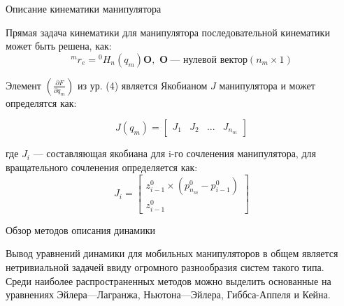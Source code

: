 \documentclass[newPxFont,numfooter,sectionpages]{beamer}
\begin{document}
\begin{frame}{Описание кинематики манипулятора}

	\begin{center}
		\begin{minipage}[b]{0.9\textwidth}
			Прямая задача кинематики для  манипулятора последовательной кинематики может быть решена, как:
\begin{equation}
^mr_e = {^0H}_n(q_{m})\mathbf{O},\,\, \mathbf{O}\ \text{--- нулевой вектор} (n_m\times 1)
\tag{15} \label{eq:15}
\end{equation}
	
Элемент $\left(\frac{\partial F}{\partial q_m}\right)$ из ур. (4) является Якобианом $J$ манипулятора и может определятся как:

\begin{equation}
J(q_m) = 
\begin{bmatrix}
J_1 & J_2 & ... & J_{n_m}
\end{bmatrix}
\tag{16} \label{eq:16}
\end{equation}

\noindent
где $J_i$ --- составляющая якобиана для i-го сочленения манипулятора, для вращательного сочленения определяется как:
\begin{equation}
J_i = 
\begin{bmatrix}
z^0_{i-1} \times (p^0_{n_m} - p^0_{i-1})\\[1mm]
z^0_{i-1}
\end{bmatrix}
\tag{17} \label{eq:17}
\end{equation}
		\end{minipage}
	\end{center}
\end{frame}

\begin{frame}{Обзор методов описания динамики}

	\begin{center}
		\begin{minipage}[b]{0.9\textwidth}
			Вывод уравнений динамики для мобильных манипуляторов в общем является нетривиальной задачей ввиду огромного разнообразия систем такого типа.
			\ \\
			
			Среди наиболее распространенных методов можно выделить основанные на уравнениях Эйлера---Лагранжа, Ньютона---Эйлера, Гиббса-Аппеля и Кейна.
		\end{minipage}
	\end{center}
\end{frame}
\end{document}
